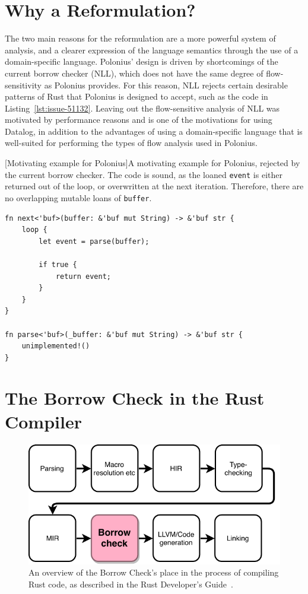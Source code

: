 \documentclass[11pt,a4paper,twoside,openany,draft]{report}
\newenvironment{sourcecode}{\captionsetup{type=listing}}{}
\newcommand{\InRust}[1]{\texttt{#1}}
\begin{document}
\section{Why a Reformulation?}\label{sec:background:why}

The two main reasons for the reformulation are a more powerful system of
analysis, and a clearer expression of the language semantics through the use of
a domain-specific language. Polonius' design is driven by shortcomings of the
current borrow checker (NLL), which does not have the same degree of
flow-sensitivity as Polonius provides. For this reason, NLL rejects certain
desirable patterns of Rust that Polonius is designed to accept, such as the code
in Listing~\ref{lst:issue-51132}. Leaving out the flow-sensitive analysis of NLL
was motivated by performance reasons and is one of the motivations for using
Datalog, in addition to the advantages of using a domain-specific language that
is well-suited for performing the types of flow analysis used in Polonius.

\begin{sourcecode}
  [Motivating example for Polonius]{A motivating example for
    Polonius, rejected by the current borrow checker. The code is sound, as the
    loaned \InRust{event} is either returned out of the loop, or overwritten at
    the next iteration. Therefore, there are no overlapping mutable loans of
    \InRust{buffer}.~\cite{issue-51132}}\label{lst:issue-51132}
\begin{verbatim}
fn next<'buf>(buffer: &'buf mut String) -> &'buf str {
    loop {
        let event = parse(buffer);

        if true {
            return event;
        }
    }
}

fn parse<'buf>(_buffer: &'buf mut String) -> &'buf str {
    unimplemented!()
}
\end{verbatim}
\end{sourcecode}

\section{The Borrow Check in the Rust Compiler}
\label{sec:rust-specificts}

\begin{figure}[h!]
  \includegraphics[width=0.9\linewidth]{Graphs/rustc-overview}
  \caption[The Rust Compilation Process]{An overview of the Borrow Check's place
    in the process of compiling Rust code, as described in the Rust Developer's
    Guide~\cite{rustc_developers_guide_nodate}.}
  \label{fig:rustc-overview}
\end{figure}
\end{document}
